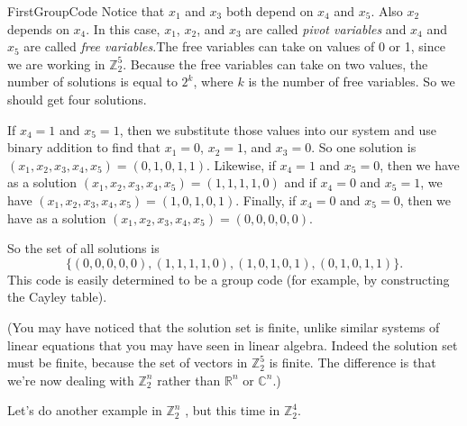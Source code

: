 \begin{example}{FirstGroupCode}
Notice that $x_1$ and $x_3$ both depend on $x_4$ and $x_5$. Also $x_2$ depends on $x_4$. In this case,     $x_1$, $x_2$, and $x_3$ are called \emph{pivot variables} and $x_4$ and $x_5$ are called \emph{free variables}.The free variables can take on values of 0 or 1, since we are working in $\mathbb{Z}_2^5$. Because the free variables can take on two values, the number of solutions is equal to $2^k$, where $k$ is the number of free variables. So we should get four solutions.


If $x_4=1$ and $x_5=1$, then we substitute those values into our system and use binary addition to find that $x_1=0$, $x_2=1$, and $x_3=0$. So one solution is $(x_1,x_2,x_3,x_4,x_5) = (0,1,0,1,1)$.
Likewise, if $x_4=1$ and $x_5=0$, then we have as a solution $(x_1,x_2,x_3,x_4,x_5) = (1,1,1,1,0)$
and if $x_4=0$ and $x_5=1$, we have $(x_1,x_2,x_3,x_4,x_5) = (1,0,1,0,1)$.
Finally, if $x_4=0$ and $x_5=0$, then we have as a solution $(x_1,x_2,x_3,x_4,x_5) = (0,0,0,0,0)$.

So the  set of all solutions is
\[
\{(0,0,0,0,0),(1,1,1,1,0), (1,0,1,0,1), (0,1,0,1,1)\}.
\]
 This code is easily determined to be a group code (for example, by constructing the Cayley table).

(You may have noticed that the solution set is finite, unlike similar systems of linear equations that you may have seen in linear algebra. Indeed the solution set must be finite, because the set of vectors in $\mathbb{Z}_2^5$ is finite. The difference is that we're now dealing with $\mathbb{Z}_2^n$ rather than $\mathbb{R}^n$ or $\mathbb{C}^n$.) 
\end{example}
Let's do another example in $\mathbb{Z}_2^n$ , but this time in $\mathbb{Z}_2^4$.

